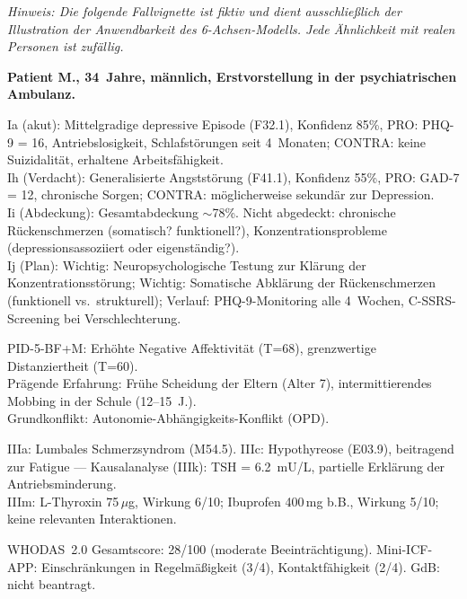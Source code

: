 \documentclass[11pt,a4paper]{article}
\begin{document}
\textit{Hinweis: Die folgende Fallvignette ist fiktiv und dient ausschlie\ss{}lich der Illustration der Anwendbarkeit des 6-Achsen-Modells. Jede \"Ahnlichkeit mit realen Personen ist zuf\"allig.}

\vspace{0.5em}
\noindent \textbf{Patient M., 34~Jahre, m\"annlich, Erstvorstellung in der psychiatrischen Ambulanz.}

\begin{description}[style=nextline, leftmargin=1.5cm, font=\bfseries\small]
\item[Achse~I (Psychische Profile)]
Ia (akut): Mittelgradige depressive Episode (F32.1), Konfidenz 85\%, PRO: PHQ-9 = 16, Antriebslosigkeit, Schlafst\"orungen seit 4~Monaten; CONTRA: keine Suizidalit\"at, erhaltene Arbeitsf\"ahigkeit. \\
Ih (Verdacht): Generalisierte Angstst\"orung (F41.1), Konfidenz 55\%, PRO: GAD-7 = 12, chronische Sorgen; CONTRA: m\"oglicherweise sekund\"ar zur Depression. \\
Ii (Abdeckung): Gesamtabdeckung $\sim$78\%. Nicht abgedeckt: chronische R\"uckenschmerzen (somatisch? funktionell?), Konzentrationsprobleme (depressionsassoziiert oder eigenst\"andig?). \\
Ij (Plan): Wichtig: Neuropsychologische Testung zur Kl\"arung der Konzentrationsst\"orung; Wichtig: Somatische Abkl\"arung der R\"uckenschmerzen (funktionell vs.\ strukturell); Verlauf: PHQ-9-Monitoring alle 4~Wochen, C-SSRS-Screening bei Verschlechterung.
\item[Achse~II (Biographie)]
PID-5-BF+M: Erh\"ohte Negative Affektivit\"at (T=68), grenzwertige Distanziertheit (T=60). \\
Pr\"agende Erfahrung: Fr\"uhe Scheidung der Eltern (Alter 7), intermittierendes Mobbing in der Schule (12--15~J.). \\
Grundkonflikt: Autonomie-Abh\"angigkeits-Konflikt (OPD).
\item[Achse~III (Med. Synopse)]
IIIa: Lumbales Schmerzsyndrom (M54.5). IIIc: Hypothyreose (E03.9), beitragend zur Fatigue --- Kausalanalyse (IIIk): TSH = 6.2~mU/L, partielle Erkl\"arung der Antriebsminderung. \\
IIIm: L-Thyroxin 75\,$\mu$g, Wirkung 6/10; Ibuprofen 400\,mg b.B., Wirkung 5/10; keine relevanten Interaktionen.
\item[Achse~IV (Umwelt \& Funktion)]
WHODAS~2.0 Gesamtscore: 28/100 (moderate Beeintr\"achtigung). Mini-ICF-APP: Einschr\"ankungen in Regelm\"a\ss{}igkeit (3/4), Kontaktf\"ahigkeit (2/4). GdB: nicht beantragt. \\

\end{description}
\end{document}
